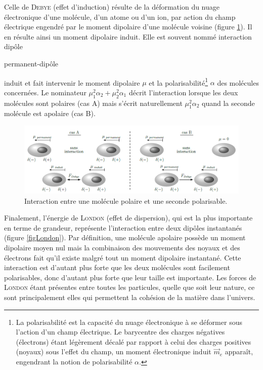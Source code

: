 Celle de \textsc{Debye} (effet d'induction) résulte de la déformation du nuage électronique d'une molécule, d'un atome ou d'un ion, par action du champ électrique engendré par le moment dipolaire d'une molécule voisine (figure \ref{figDebye}). Il en résulte ainsi un moment dipolaire induit. Elle est souvent nommé interaction dipôle {permanent-dipôle{ induit et fait intervenir le moment dipolaire $\mu$ et la polarisabilité\footnote{La polarisabilité est la capacité du nuage électronique à se déformer sous l'action d'un champ électrique. Le barycentre des charges négatives (électrons) étant légèrement décalé par rapport à celui des charges positives (noyaux) sous l'effet du champ, un moment électronique induit $\vec{m}_{e}$ apparaît, engendrant la notion de polarisabilité $\alpha$.} $\alpha$ des molécules concernées. Le nominateur $\mu_{1}^{2}\alpha_{2}+\mu_{2}^{2}\alpha_{1}$ décrit l'interaction lorsque les deux molécules sont polaires (cas A) mais s'écrit naturellement $\mu_{1}^{2}\alpha_{2}$ quand la seconde molécule est apolaire (cas B).

\begin{figure}[h]
\centering
\includegraphics[scale=0.9]{image/Debye}
\caption{Interaction entre une molécule polaire et une seconde polarisable.}
\label{figDebye}
\end{figure}

Finalement, l'énergie de \textsc{London} (effet de dispersion), qui est la plus importante en terme de grandeur, représente l'interaction entre deux dipôles instantanés (figure \ref{figLondon}). Par définition, une molécule apolaire possède un moment dipolaire moyen nul mais la combinaison des mouvements des noyaux et des électrons fait qu'il existe malgré tout un moment dipolaire instantané. Cette interaction est d'autant plus forte que les deux molécules sont facilement polarisables, donc d'autant plus forte que leur taille est importante. Les forces de \textsc{London} étant présentes entre toutes les particules, quelle que soit leur nature, ce sont principalement elles qui permettent la cohésion de la matière dans l'univers.

}}
